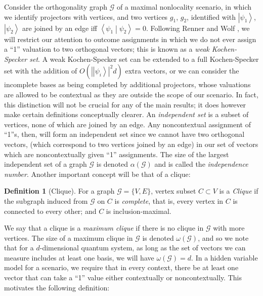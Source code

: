 \documentclass{amsart}
\theoremstyle{definition}
\newtheorem{defn}{Definition}
\newcommand{\ket}[1]{{\left\vert{#1}\right\rangle}}
\newcommand{\braket}[2]{{\left< {#1} \middle\vert {#2}\right>}}
\begin{document}
Consider the orthogonality graph $\mathcal{G}$ of a maximal nonlocality scenario, in which we identify projectors with vertices, and two vertices $g_1$, $g_2$, identified with $\ket{\psi_1}$, $\ket{\psi_2}$ are joined by an edge iff $\braket{\psi_1}{\psi_2}=0$. Following Renner and Wolf \cite{Renn2004}, we will restrict our attention to outcome assignments in which we do not ever assign a ``1'' valuation to two orthogonal vectors; this is known as a \emph{weak Kochen-Specker set}. A weak Kochen-Specker set can be extended to a full Kochen-Specker set with the addition of $O(|\ket{\psi_i}|^2d)$ extra vectors, or we can consider the incomplete bases as being completed by additional projectors, whose valuations are allowed to be contextual as they are outside the scope of our scenario. In fact, this distinction will not be crucial for any of the main results; it does however make certain definitions conceptually clearer. An \emph{independent set} is a subset of vertices, none of which are joined by an edge. Any noncontextual assignment of ``1''s, then, will form an independent set since we cannot have two orthogonal vectors, (which correspond to two vertices joined by an edge) in our set of vectors which are noncontextually given ``1'' assignments. The size of the largest independent set of a graph $\mathcal{G}$ is denoted $\alpha(\mathcal{G})$ and is called the \emph{independence number}. Another important concept will be that of a clique:%

\begin{defn}[Clique]
For a graph $\mathcal{G}=\{V,E\}$, vertex subset $C\subset V$ is a \emph{Clique} if the subgraph induced from $\mathcal{G}$ on $C$ is \emph{complete}, that is, every vertex in $C$ is connected to every other; and $C$ is inclusion-maximal.
\end{defn}

We say that a clique is a \emph{maximum clique} if there is no clique in $\mathcal{G}$ with more vertices. The size of a maximum clique in $\mathcal{G}$ is denoted $\omega(\mathcal{G})$, and so we note that for a $d$-dimensional quantum system, as long as the set of vectors we can measure includes at least one basis, we will have $\omega(\mathcal{G})=d$. In a hidden variable model for a scenario, we require that in every context, there be at least one vector that can take a ``1'' value either contextually or noncontextually. This motivates the following definition:
\end{document}
